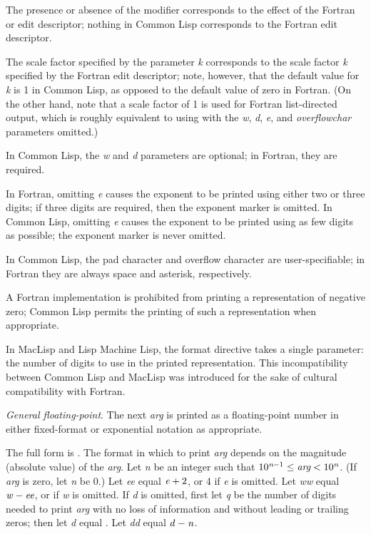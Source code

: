 \begin{flushdesc}
\begin{incompatibility}
The presence
or absence of the \cd{{\Xatsign}} modifier corresponds to the effect of
the Fortran  or  edit descriptor; nothing in Common Lisp
corresponds to the Fortran  edit descriptor.

The scale factor
specified by the parameter {\it k} corresponds to the scale factor {\it k}
specified by the Fortran  edit descriptor;
note, however, that the default value for {\it k} is 1 in Common Lisp,
as opposed to the default value of zero in Fortran.
(On the other hand, note that a scale factor of 1 is used
for Fortran list-directed output, which is roughly
equivalent to using  with the {\it w}, {\it d},
{\it e}, and {\it overflowchar} parameters
omitted.)

In Common Lisp, the {\it w} and {\it d}
parameters are optional; in Fortran, they are required.

In Fortran, omitting {\it e} causes the exponent to be printed using
either two or three digits; if three digits are required, then the
exponent marker is omitted.  In Common Lisp, omitting {\it e} causes the
exponent to be printed using as few digits as possible; the exponent marker
is never omitted.

In Common Lisp, the pad character and overflow character are user-specifiable;
in Fortran they are always space and asterisk, respectively.

A Fortran implementation
is prohibited from printing a representation of negative zero;
Common Lisp permits the printing of such a representation when appropriate.

In MacLisp and Lisp Machine Lisp, the  format directive takes
a single parameter: the number of digits to use in the printed
representation.  This incompatibility between
Common Lisp and MacLisp was introduced for the sake of cultural compatibility
with Fortran.
\end{incompatibility}
\afternoterule

\newpage%

\item[\cd{{\Xtilde}G}]
{\it General floating-point}.  The next {\it arg} is printed as a floating-point
number in either fixed-format or exponential notation as appropriate.

The full form is .
The format in which to print {\it arg} depends on the magnitude (absolute
value) of the {\it arg}.  Let {\it n} be an integer such that
\(10^{\hbox{\scriptsize\it n}-1}\leq\hbox{\it arg}<10^{\hbox{\scriptsize\it n}}\).
(If {\it arg} is zero, let {\it n} be 0.)
Let {\it ee} equal ${\it e}+2$, or 4 if {\it e} is omitted.
Let {\it ww} equal ${\it w}-\hbox{\it ee}$,
or {\nil} if {\it w} is omitted.  If {\it d} is omitted, first let {\it q}
be the number of digits needed to print {\it arg} with no loss
of information and without leading or trailing zeros;
then let {\it d} equal .
Let {\it dd} equal ${\it d}-{\it n}$.


\end{flushdesc}
